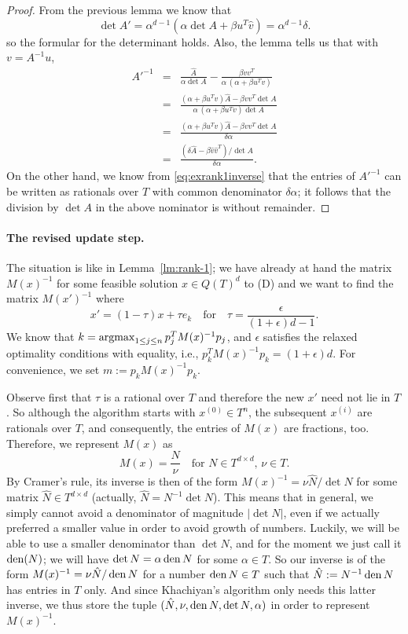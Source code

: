 \documentclass[a4paper,twocolumn]{article}
\newcommand{\D}{\ensuremath{T}}%
\newcommand{\den}{\ensuremath{\mathop{\rm den}\nolimits}}
\newcommand{\argmax}{\ensuremath{\mathop{\rm argmax}\nolimits}}
\begin{document}
\begin{proof}
   From the previous lemma we know that
   \[ \det{A'} = \alpha^{d-1} (\alpha\det{A}+\beta u^T\hat{v})
               = \alpha^{d-1} \delta.
   \]
   so the formular for the determinant holds.  Also, the lemma tells
   us that with $v = A^{-1} u$,
   \begin{eqnarray*}
   A'^{-1} &=& \frac{\hat{A}}{\alpha \det{A}} -
               \frac{\beta vv^T}{\alpha\,(\alpha+\beta u^T v)} \\
           &=& \frac{(\alpha + \beta u^T v) \hat{A} - \beta vv^T\det{A}}%
               {\alpha\,(\alpha+\beta u^T v) \det{A}} \\
           &=& \frac{(\alpha + \beta u^T v) \hat{A} -
               \beta vv^T\det{A}}{\delta\alpha} \\
	   &=& \frac{(\delta \hat{A} - \beta
	       \hat{v}\hat{v}^T)/\det{A}}{\delta\alpha}.
   \end{eqnarray*}
   On the other hand, we know from \eqref{eq:exrank1inverse} that the
   entries of $A'^{-1}$ can be written as rationals over $T$ with
   common denominator $\delta\alpha$; it follows that the division by
   $\det{A}$ in the above nominator is without remainder.
\end{proof}
%
%
\paragraph{The revised update step.}
The situation is like in Lemma~\ref{lm:rank-1}; we have already at
hand the matrix $M(x)^{-1}$ for some feasible solution $x\in Q(\D)^d$
to (D) and we want to find the matrix $M(x')^{-1}$ where
\[
x' = (1-\tau) x+ \tau e_k \quad \mbox{for} \quad
\tau = \frac{\epsilon}{(1+\epsilon)d-1}.
\]
We know that $k=\argmax_{1\le j\le n} p_j^T M(x)^{-1} p_j$, and $\epsilon$
satisfies the relaxed optimality conditions with equality, i.e.,
$p_k^T M(x)^{-1} p_k = (1+\epsilon)d$.  For convenience, we set $m:=
p_k M(x)^{-1} p_k$.

Observe first that $\tau$ is a rational over $\D$ and therefore the
new $x'$ need not lie in $\D$.  So although the algorithm starts with
$x^{(0)}\in\D^n$, the subsequent $x^{(i)}$ are rationals over $T$, and
consequently, the entries of $M(x)$ are fractions, too.  Therefore, we
represent $M(x)$ as
\[
M(x) = \frac{N}{\nu}
\quad \mbox{for $N\in \D^{d\times d}$, $\nu\in T$}.
\]
By Cramer's rule, its inverse is then of the form $M(x)^{-1} = \nu
\hat{N}/\det{N}$ for some matrix $\hat{N}\in \D^{d\times d}$
(actually, $\hat{N} = N^{-1}\det{N}$).  This means that in general, we
simply cannot avoid a denominator of magnitude $|\det{N}|$, even if we
actually preferred a smaller value in order to avoid growth of
numbers.  Luckily, we will be able to use a smaller denominator than
$\det{N}$, and for the moment we just call it $\den(N)$; we will have
$\det{N} = \alpha \den{N}$ for some $\alpha\in T$.  So our inverse is
of the form $M(x)^{-1} = \nu\hat{N}/\den{N}$ for a number $\den{N}\in
T$ such that $\hat{N}:= N^{-1}\den{N}$ has entries in $T$ only.  And
since Khachiyan's algorithm only needs this latter inverse, we thus
store the tuple $(\hat{N},\nu,\den{N},\det{N},\alpha)$ in order to
represent $M(x)^{-1}$.
\end{document}

